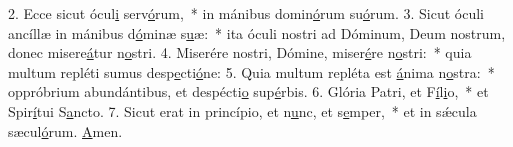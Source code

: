 2. Ecce sicut ócul\uline{i} serv\uline{ó}rum,~* in mánibus domin\uline{ó}rum su\uline{ó}rum.
3. Sicut óculi ancíllæ in mánibus d\uline{ó}minæ s\uline{u}æ:~* ita óculi nostri ad Dóminum, Deum nostrum, donec misere\uline{á}tur n\uline{o}stri.
4. Miserére nostri, Dómine, miser\uline{é}re n\uline{o}stri:~* quia multum repléti sumus desp\uline{e}cti\uline{ó}ne:
5. Quia multum repléta est \uline{á}nima n\uline{o}stra:~* oppróbrium abundántibus, et despécti\uline{o} sup\uline{é}rbis.
6. Glória Patri, et F\uline{í}l\uline{i}o,~* et Spir\uline{í}tui S\uline{a}ncto.
7. Sicut erat in princípio, et n\uline{u}nc, et s\uline{e}mper,~* et in sǽcula sæcul\uline{ó}rum. \uline{A}men.
